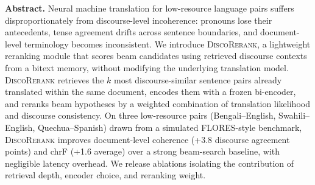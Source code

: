 \documentclass[10pt,twocolumn]{article}
\begin{document}
{\begin{center}
\begin{minipage}{0.92\textwidth}
\small
\textbf{Abstract.} Neural machine translation for low-resource language pairs
suffers disproportionately from discourse-level incoherence: pronouns lose
their antecedents, tense agreement drifts across sentence boundaries, and
document-level terminology becomes inconsistent. We introduce
\textsc{DiscoRerank}, a lightweight reranking module that scores beam
candidates using retrieved discourse contexts from a bitext memory, without
modifying the underlying translation model. \textsc{DiscoRerank} retrieves the
$k$ most discourse-similar sentence pairs already translated within the same
document, encodes them with a frozen bi-encoder, and reranks beam hypotheses
by a weighted combination of translation likelihood and discourse
consistency. On three low-resource pairs (Bengali--English, Swahili--English,
Quechua--Spanish) drawn from a simulated FLORES-style benchmark,
\textsc{DiscoRerank} improves document-level coherence (+3.8 discourse
agreement points) and chrF (+1.6 average) over a strong beam-search baseline,
with negligible latency overhead. We release ablations isolating the
contribution of retrieval depth, encoder choice, and reranking weight.
\end{minipage}
\end{center}
\vspace{1.1em}
}

\twocolumn[\PaperTitleBlock]










\end{document}
